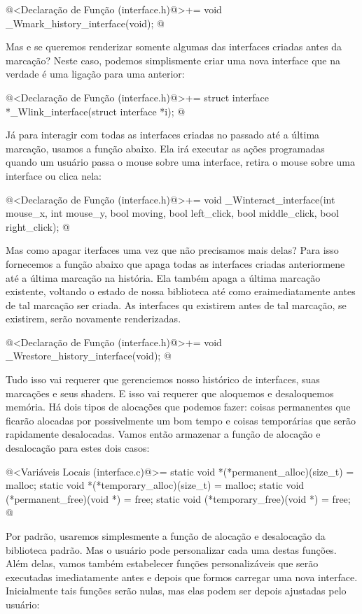 \iniciocodigo
@<Declaração de Função (interface.h)@>+=
void _Wmark_history_interface(void);
@
\fimcodigo

Mas e se queremos renderizar somente algumas das interfaces criadas
antes da marcação? Neste caso, podemos simplismente criar uma nova
interface que na verdade é uma ligação para uma anterior:

\iniciocodigo
@<Declaração de Função (interface.h)@>+=
struct interface *_Wlink_interface(struct interface *i);
@
\fimcodigo

Já para interagir com todas as interfaces criadas no passado até a
última marcação, usamos a função abaixo. Ela irá executar as ações
programadas quando um usuário passa o mouse sobre uma interface,
retira o mouse sobre uma interface ou clica nela:

\iniciocodigo
@<Declaração de Função (interface.h)@>+=
void _Winteract_interface(int mouse_x, int mouse_y, bool moving, bool left_click,
                          bool middle_click, bool right_click);
@
\fimcodigo


Mas como apagar iterfaces uma vez que não precisamos mais delas? Para
isso fornecemos a função abaixo que apaga todas as interfaces criadas
anteriormene até a última marcação na história. Ela também apaga a
última marcação existente, voltando o estado de nossa biblioteca até
como eraimediatamente antes de tal marcação ser criada. As interfaces
qu existirem antes de tal marcação, se existirem, serão novamente
renderizadas.

\iniciocodigo
@<Declaração de Função (interface.h)@>+=
void _Wrestore_history_interface(void);
@
\fimcodigo

Tudo isso vai requerer que gerenciemos nosso histórico de interfaces,
suas marcações e seus shaders. E isso vai requerer que aloquemos e
desaloquemos memória. Há dois tipos de alocações que podemos fazer:
coisas permanentes que ficarão alocadas por possivelmente um bom tempo
e coisas temporárias que serão rapidamente desalocadas. Vamos então
armazenar a função de alocação e desalocação para estes dois casos:

\iniciocodigo
@<Variáveis Locais (interface.c)@>=
static void *(*permanent_alloc)(size_t) = malloc;
static void *(*temporary_alloc)(size_t) = malloc;
static void (*permanent_free)(void *) = free;
static void (*temporary_free)(void *) = free;
@
\fimcodigo

Por padrão, usaremos simplesmente a função de alocação e desalocação
da biblioteca padrão. Mas o usuário pode personalizar cada uma destas
funções. Além delas, vamos também estabelecer funções personalizáveis
que serão executadas imediatamente antes e depois que formos carregar
uma nova interface. Inicialmente tais funções serão nulas, mas elas
podem ser depois ajustadas pelo usuário:

